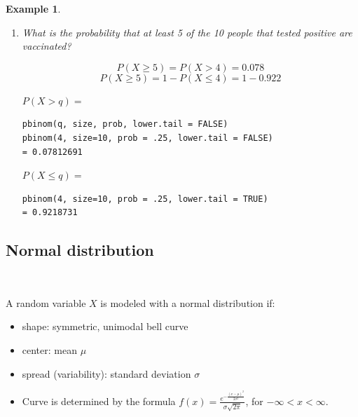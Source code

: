 \documentclass[12pt]{amsart}
\newtheorem{example}[theorem]{Example}
\newcommand{\m}{\mu}
\newcommand{\s}{\sigma}
\begin{document}
{\begin{example}
\begin{enumerate}
\color{blue}
$$
P(X \leq 3) = 
$$
\vspace{1cm}

$P(X \leq q) =$
\begin{verbatim}
pbinom(q, size, prob, lower.tail = TRUE) 
pbinom(3, size=10, prob = .25)= 0.2502823
\end{verbatim}
\color{black}


\item What is the probability that at least 5 of the 10 people that tested positive are vaccinated?

\color{blue}
$$
P(X \geq 5) = P(X > 4) = 0.078
$$
$$
P(X \geq 5) = 1 - P(X \leq 4) = 1- 0.922
$$
\vspace{1cm}

$P(X > q) =$
\begin{verbatim}
pbinom(q, size, prob, lower.tail = FALSE) 
pbinom(4, size=10, prob = .25, lower.tail = FALSE) 
= 0.07812691
\end{verbatim}
$P(X \leq q) =$
\begin{verbatim}
pbinom(4, size=10, prob = .25, lower.tail = TRUE) 
= 0.9218731
\end{verbatim}
\color{black}



\end{enumerate}

\end{example} 



\newpage


\vspace{.5cm}

\subsection{Normal distribution} $\ $ \newline

A random variable $X$ is modeled with a normal distribution if:
\begin{itemize}
\item shape: symmetric, unimodal bell curve
\item center: mean $\m$
\item spread (variability): standard deviation $\s$
\item Curve is determined by the formula $f(x) = \frac{e^{-\frac{(x-\m)^2}{2\s^2}}}{\s\sqrt{2\pi}}$, for $-\infty < x< \infty$.


\end{itemize}}
\end{document}
